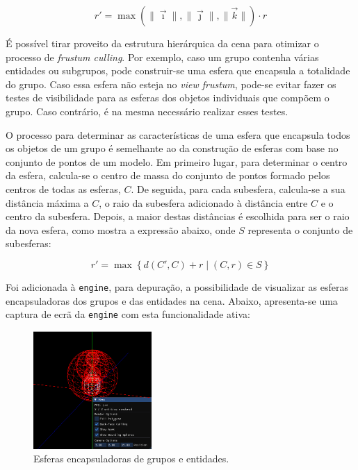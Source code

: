 \documentclass[12pt, a4paper]{article}
\begin{document}
$$
r' =
    \max
        \left ( \lVert \vec \imath \rVert, \lVert \vec \jmath \rVert, \lVert \vec k \rVert \right )
    \cdot
        r
$$

É possível tirar proveito da estrutura hierárquica da cena para otimizar o processo de
\emph{frustum culling}. Por exemplo, caso um grupo contenha várias entidades ou subgrupos, pode
construir-se uma esfera que encapsula a totalidade do grupo. Caso essa esfera não esteja no
\emph{view frustum}, pode-se evitar fazer os testes de visibilidade para as esferas dos objetos
individuais que compõem o grupo. Caso contrário, é na mesma necessário realizar esses testes.

O processo para determinar as características de uma esfera que encapsula todos os objetos de um
grupo é semelhante ao da construção de esferas com base no conjunto de pontos de um modelo. Em
primeiro lugar, para determinar o centro da esfera, calcula-se o centro de massa do conjunto de
pontos formado pelos centros de todas as esferas, $C$. De seguida, para cada subesfera, calcula-se
a sua distância máxima a $C$, o raio da subesfera adicionado à distância entre $C$ e o centro da
subesfera. Depois, a maior destas distâncias é escolhida para ser o raio da nova esfera, como mostra
a expressão abaixo, onde $S$ representa o conjunto de subesferas:

$$
r' = \max \left \lbrace d(C', C) + r \mid (C, r) \in S \right \rbrace
$$

Foi adicionada à \texttt{engine}, para depuração, a possibilidade de visualizar as esferas
encapsuladoras dos grupos e das entidades na cena. Abaixo, apresenta-se uma captura de ecrã da
\texttt{engine} com esta funcionalidade ativa:

\begin{figure}[H]
    \centering
    \includegraphics[width=0.4\textwidth]{res/phase2/BoundingSpheres.png}
    \caption{Esferas encapsuladoras de grupos e entidades.}
\end{figure}
\end{document}
